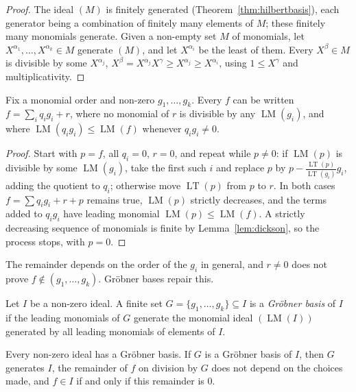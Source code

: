 \begin{proof}
The ideal $(M)$ is finitely generated (Theorem~\ref{thm:hilbertbasis}), each generator being a combination of finitely many elements of $M$; these finitely many monomials generate. Given a non-empty set $M$ of monomials, let
$X^{\alpha_1},\dots,X^{\alpha_k}\in M$ generate $(M)$, and let $X^{\alpha_i}$ be the least of them. Every $X^\beta\in M$ is divisible by some $X^{\alpha_j}$, $X^\beta=X^{\alpha_j}X^\gamma\ge X^{\alpha_j}\ge X^{\alpha_i}$, using $1\le X^\gamma$ and
multiplicativity.
\end{proof}

\begin{proposition}[division]\label{prop:division}
Fix a monomial order and non-zero $g_1,\dots,g_k$. Every $f$ can be written $f=\sum_iq_ig_i+r$, where no monomial of $r$ is divisible by any $\operatorname{LM}(g_i)$, and where $\operatorname{LM}(q_ig_i)\le\operatorname{LM}(f)$ whenever $q_ig_i\ne0$.
\end{proposition}

\begin{proof}
Start with $p=f$, all $q_i=0$, $r=0$, and repeat while $p\ne0$: if $\operatorname{LM}(p)$ is divisible by some $\operatorname{LM}(g_i)$, take the first such $i$ and replace $p$ by $p-\frac{\operatorname{LT}(p)}{\operatorname{LT}(g_i)}g_i$, adding the
quotient to $q_i$; otherwise move $\operatorname{LT}(p)$ from $p$ to $r$. In both cases $f=\sum q_ig_i+r+p$ remains true, $\operatorname{LM}(p)$ strictly decreases, and the terms added to $q_ig_i$ have leading monomial $\operatorname{LM}(p)\le\operatorname{LM}(f)$.
A strictly decreasing sequence of monomials is finite by Lemma~\ref{lem:dickson}, so the process stops, with $p=0$.
\end{proof}

The remainder depends on the order of the $g_i$ in general, and $r\ne0$ does not prove $f\notin(g_1,\dots,g_k)$. Gröbner bases repair this.

\begin{definition}\label{def:groebner}
Let $I$ be a non-zero ideal. A finite set $G=\{g_1,\dots,g_k\}\subseteq I$ is a \emph{Gröbner basis} of $I$ if the leading monomials of $G$ generate the monomial ideal $(\operatorname{LM}(I))$ generated by all leading monomials of
elements of $I$.
\end{definition}

\begin{proposition}\label{prop:groebnerprops}
Every non-zero ideal has a Gröbner basis. If $G$ is a Gröbner basis of $I$, then $G$ generates $I$, the remainder of $f$ on division by $G$ does not depend on the choices made, and $f\in I$ if and only if this remainder is $0$.
\end{proposition}

